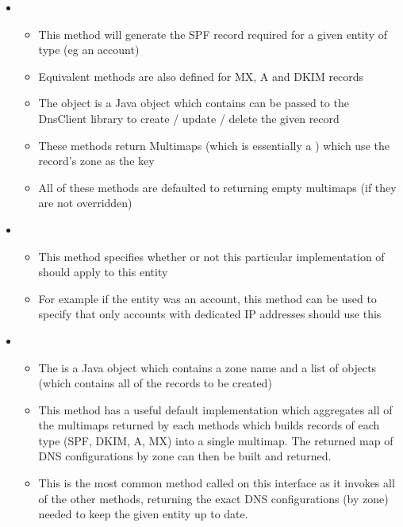 \begin{itemize}

      \item{}
      \begin{itemize}
            \item{This method will generate the SPF record required for a given entity of type  (eg an account)}
            \item{Equivalent methods are also defined for MX, A and DKIM records}
            \item{The  object is a Java object which contains can be passed to the DnsClient library to create / update / delete the given record}
            \item{These methods return Multimaps (which is essentially a ) which use the record's zone as the key}
            \item{All of these methods are defaulted to returning empty multimaps (if they are not overridden)}
      \end{itemize}

      \item{}
      \begin{itemize}
            \item{This method specifies whether or not this particular implementation of  should apply to this entity}
            \item{For example if the entity was an account, this method can be used to specify that only accounts with dedicated IP addresses should use this }
      \end{itemize}

      \item{}
      \begin{itemize}
            \item{The  is a Java object which contains a zone name and a list of  objects (which contains all of the records to be created)}
            \item{This method has a useful default implementation which aggregates all of the multimaps returned by each methods which builds records of each type (SPF, DKIM, A, MX) into a single multimap. The returned map of  DNS configurations by zone can then be built and returned.}
            \item{This is the most common method called on this interface as it invokes all of the other methods, returning the exact DNS configurations (by zone) needed to keep the given entity up to date.}
      \end{itemize}


\end{itemize}

